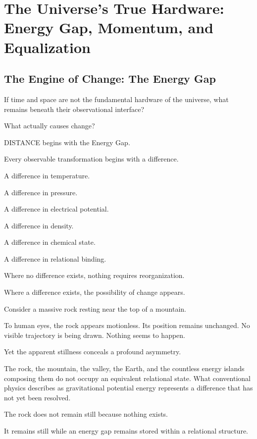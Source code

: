 

\section{The Universe’s True Hardware: Energy Gap, Momentum, and Equalization}

\subsection*{\textbf{The Engine of Change: The Energy Gap}}

If time and space are not the fundamental hardware of the universe, what remains beneath their observational interface?

What actually causes change?

DISTANCE begins with the Energy Gap.

Every observable transformation begins with a difference.

A difference in temperature.

A difference in pressure.

A difference in electrical potential.

A difference in density.

A difference in chemical state.

A difference in relational binding.

Where no difference exists, nothing requires reorganization.

Where a difference exists, the possibility of change appears.

Consider a massive rock resting near the top of a mountain.

To human eyes, the rock appears motionless. Its position remains unchanged. No visible trajectory is being drawn. Nothing seems to happen.

Yet the apparent stillness conceals a profound asymmetry.

The rock, the mountain, the valley, the Earth, and the countless energy islands composing them do not occupy an equivalent relational state. What conventional physics describes as gravitational potential energy represents a difference that has not yet been resolved.

The rock does not remain still because nothing exists.

It remains still while an energy gap remains stored within a relational structure.

